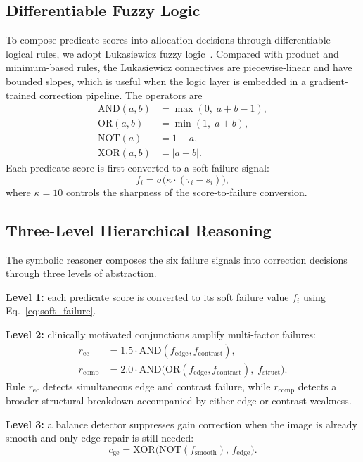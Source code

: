 \documentclass{ieeetj}
\begin{document}
\subsection{Differentiable Fuzzy Logic}
\label{sec:fuzzy}
To compose predicate scores into allocation decisions through differentiable logical rules, we adopt Lukasiewicz fuzzy logic~\cite{vankrieken2022analyzing}. Compared with product and minimum-based rules, the Lukasiewicz connectives are piecewise-linear and have bounded slopes, which is useful when the logic layer is embedded in a gradient-trained correction pipeline. The operators are
\begin{align*}
\text{AND}(a,b) &= \max(0,\; a + b - 1), \\
\text{OR}(a,b) &= \min(1,\; a + b), \\
\text{NOT}(a) &= 1 - a, \\
\text{XOR}(a,b) &= |a - b|.
\end{align*}
Each predicate score is first converted to a soft failure signal:
\begin{equation}
f_i = \sigma\!\big(\kappa \cdot (\tau_i - s_i)\big),
\label{eq:soft_failure}
\end{equation}
where $\kappa=10$ controls the sharpness of the score-to-failure conversion.

\subsection{Three-Level Hierarchical Reasoning}
The symbolic reasoner composes the six failure signals into correction decisions through three levels of abstraction.

\textbf{Level 1:} each predicate score is converted to its soft failure value $f_i$ using Eq.~\eqref{eq:soft_failure}.

\textbf{Level 2:} clinically motivated conjunctions amplify multi-factor failures:
\begin{align}
r_\text{ec} &= 1.5 \cdot \text{AND}(f_\text{edge}, f_\text{contrast}), \label{eq:compound1} \\
r_\text{comp} &= 2.0 \cdot \text{AND}\!\big(\text{OR}(f_\text{edge}, f_\text{contrast}),\; f_\text{struct}\big). \label{eq:compound2}
\end{align}
Rule $r_\text{ec}$ detects simultaneous edge and contrast failure, while $r_\text{comp}$ detects a broader structural breakdown accompanied by either edge or contrast weakness.

\textbf{Level 3:} a balance detector suppresses gain correction when the image is already smooth and only edge repair is still needed:
\begin{equation}
c_\text{ge} = \text{XOR}\!\big(\text{NOT}(f_\text{smooth}),\, f_\text{edge}\big).
\label{eq:balance}
\end{equation}
\end{document}
